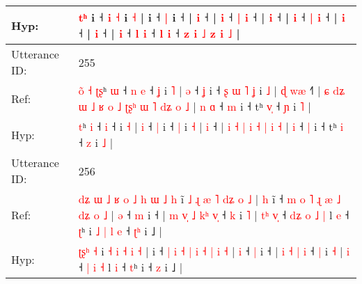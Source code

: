\documentclass[10pt]{article}
\DeclareRobustCommand{\hl}[1]{{\textcolor{red}{#1}}}
\begin{document}
\begin{longtable}{ll}
 \\
Hyp: & \hl{}\hl{}\hl{}\hl{t}\hl{ʰ} i ˧\hl{}\hl{}\hl{}\hl{} \hl{i} \hl{˧} i \hl{˧} |\hl{}\hl{} i ˧ \hl{|} i ˧ |\hl{}\hl{} \hl{i} ˧\hl{} |\hl{}\hl{} \hl{i} ˧ \hl{|} \hl{i} ˧ |\hl{}\hl{} \hl{i} ˧\hl{}\hl{}\hl{}\hl{}\hl{}\hl{} |\hl{}\hl{} \hl{i} ˧ \hl{|} \hl{i} ˧ |\hl{}\hl{} \hl{}\hl{i} ˧\hl{}\hl{}\hl{}\hl{}\hl{}\hl{}\hl{}\hl{}\hl{}\hl{}\hl{}\hl{}\hl{} |\hl{}\hl{} \hl{}\hl{i} ˧ |\hl{}\hl{} \hl{i} ˧\hl{}\hl{}\hl{}\hl{}\hl{}\hl{}\hl{}\hl{} \hl{}\hl{}\hl{l} \hl{i} ˧ \hl{}\hl{l} \hl{i} ˧ \hl{z} \hl{i} \hl{˩} \hl{z} \hl{i} \hl{˩} |
 \\
\midrule
Utterance ID: & 255 \\
Ref: & \hl{o}\hl{̃}\hl{ }\hl{˧}\hl{ }\hl{ʈ}\hl{ʂ}ʰ \hl{ɯ} ˧\hl{ }\hl{n} \hl{e} ˧\hl{ }\hl{ʝ} i \hl{˥} | \hl{ə} ˧ \hl{ʝ} i ˧\hl{ }\hl{ʂ}\hl{ }\hl{ɯ}\hl{ }\hl{˥} \hl{ʝ} i \hl{˩} |\hl{ }\hl{ɖ} \hl{w}\hl{æ} ˧\hl{˥} |\hl{ }\hl{ɕ}\hl{ }\hl{d}\hl{ʑ}\hl{ }\hl{ɯ}\hl{ }\hl{˩}\hl{ }\hl{ʁ} \hl{o} \hl{˩} \hl{ʈ}\hl{ʂ}\hl{ʰ} \hl{ɯ} \hl{˥} \hl{d}\hl{ʑ} \hl{o} \hl{˩} |\hl{ }\hl{n} \hl{ɑ} ˧ \hl{m} i ˧ tʰ \hl{v}\hl{̩} ˧ \hl{ɲ} i \hl{˥} |
 \\
Hyp: & \hl{}\hl{}\hl{}\hl{}\hl{}\hl{}\hl{t}ʰ \hl{i} ˧\hl{}\hl{} \hl{i} ˧\hl{}\hl{} i \hl{˧} | \hl{i} ˧ \hl{|} i ˧\hl{}\hl{}\hl{}\hl{}\hl{}\hl{} \hl{|} i \hl{˧} |\hl{}\hl{} \hl{}\hl{i} ˧\hl{} |\hl{}\hl{}\hl{}\hl{}\hl{}\hl{}\hl{}\hl{}\hl{}\hl{}\hl{} \hl{i} \hl{˧} \hl{}\hl{}\hl{|} \hl{i} \hl{˧} \hl{}\hl{|} \hl{i} \hl{˧} |\hl{}\hl{} \hl{i} ˧ \hl{|} i ˧ tʰ \hl{}\hl{i} ˧ \hl{z} i \hl{˩} |
 \\
\midrule
Utterance ID: & 256 \\
Ref: & \hl{d}\hl{ʑ}\hl{ }\hl{ɯ}\hl{ }\hl{˩}\hl{ }\hl{ʁ}\hl{ }\hl{o}\hl{ }\hl{˩}\hl{ }\hl{h}\hl{ }\hl{ɯ}\hl{ }\hl{˩} \hl{h} i\hl{̃}\hl{ }\hl{˩}\hl{ }\hl{ɻ} \hl{æ} \hl{˥} \hl{d}\hl{ʑ} \hl{o} \hl{˩} |\hl{ }\hl{h} i\hl{̃} ˧ \hl{m} \hl{o} \hl{˥} \hl{ɻ} \hl{æ} \hl{˩} \hl{d}\hl{ʑ} \hl{o} \hl{˩} | \hl{ə} ˧ \hl{m} i ˧ |\hl{ }\hl{m} \hl{v}\hl{̩} \hl{˩} \hl{k}\hl{ʰ} \hl{v}\hl{̩} ˧ \hl{k} i \hl{˥} |\hl{ }\hl{t}\hl{ʰ} \hl{v}\hl{̩} ˧\hl{ }\hl{d}\hl{ʑ} \hl{o} \hl{˩} \hl{|} l \hl{e} ˧ \hl{ʈ}ʰ i\hl{ }\hl{˩}\hl{ }\hl{|}\hl{ }\hl{l}\hl{ }\hl{e} ˧ \hl{ʈ}\hl{ʰ} i ˩ |
 \\
Hyp: & \hl{}\hl{}\hl{}\hl{}\hl{}\hl{}\hl{}\hl{}\hl{}\hl{}\hl{}\hl{}\hl{}\hl{}\hl{}\hl{ʈ}\hl{ʂ}\hl{ʰ} \hl{˧} i\hl{}\hl{}\hl{}\hl{}\hl{} \hl{˧} \hl{i} \hl{}\hl{˧} \hl{i} \hl{˧} |\hl{}\hl{} i\hl{} ˧ \hl{|} \hl{i} \hl{˧} \hl{|} \hl{i} \hl{˧} \hl{}\hl{|} \hl{i} \hl{˧} | \hl{i} ˧ \hl{|} i ˧ |\hl{}\hl{} \hl{}\hl{i} \hl{˧} \hl{}\hl{|} \hl{}\hl{i} ˧ \hl{|} i \hl{˧} |\hl{}\hl{}\hl{} \hl{}\hl{i} ˧\hl{}\hl{}\hl{} \hl{|} \hl{i} \hl{˧} l \hl{i} ˧ \hl{t}ʰ i\hl{}\hl{}\hl{}\hl{}\hl{}\hl{}\hl{}\hl{} ˧ \hl{}\hl{z} i ˩ |

\end{longtable}
\end{document}
